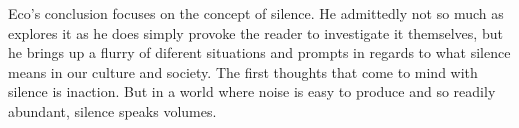 \documentclass{article}
\begin{document}
Eco's conclusion focuses on the concept of silence. He admittedly not so much as explores it as he does simply provoke the reader to investigate it themselves, but he brings up a flurry of diferent situations and prompts in regards to what silence means in our culture and society. The first thoughts that come to mind with silence is inaction. But in a world where noise is easy to produce and so readily abundant, silence speaks volumes. 
\end{document}

